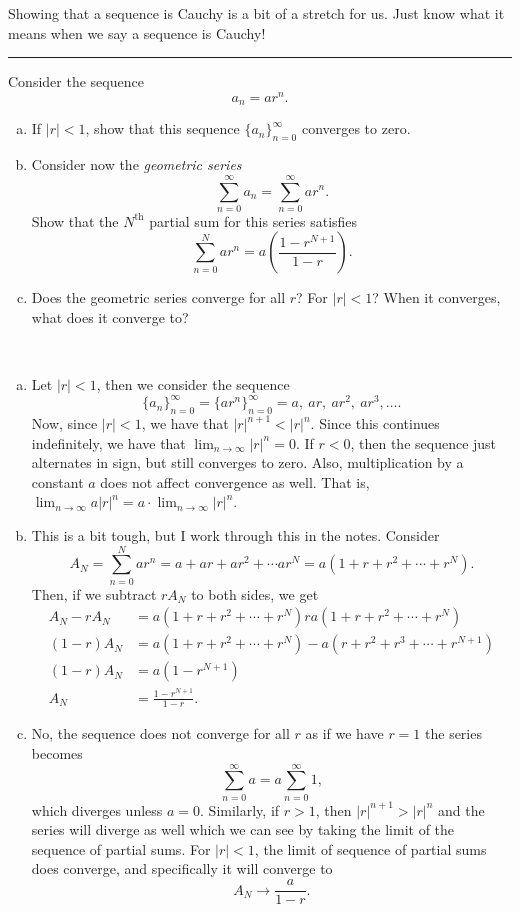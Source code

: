 \documentclass[12pt]{article} %
\begin{document}
\begin{remark}
Showing that a sequence is Cauchy is a bit of a stretch for us.  Just know what it means when we say a sequence is Cauchy!
\end{remark}

\hrule
\begin{problem}
Consider the sequence
\[
a_n = a r^n.
\]
\begin{enumerate}[(a)]
    \item If $|r|<1$, show that this sequence $\{a_n\}_{n=0}^\infty$ converges to zero.
    \item Consider now the \emph{geometric series}
    \[
    \sum_{n=0}^\infty a_n = \sum_{n=0}^\infty ar^n.
    \]
    Show that the $N^\textrm{th}$ partial sum for this series satisfies
    \[
    \sum_{n=0}^N ar^n = a\left( \frac{1-r^{N+1}}{1-r}\right).
    \]
    \item Does the geometric series converge for all $r$? For $|r|<1$? When it converges, what does it converge to?
\end{enumerate}
\end{problem}
\begin{solution}~
\begin{enumerate}[(a)]
    \item Let $|r|<1$, then we consider the sequence
    \[
    \{a_n\}_{n=0}^\infty = \{ar^n\}_{n=0}^\infty = a,~ar,~ar^2,~ar^3,\dots.
    \]
    Now, since $|r|<1$, we have that $|r|^{n+1}<|r|^n$.  Since this continues indefinitely, we have that $\lim_{n\to \infty} |r|^n = 0$.  If $r<0$, then the sequence just alternates in sign, but still converges to zero.  Also, multiplication by a constant $a$ does not affect convergence as well. That is, $\lim_{n\to \infty} a|r|^n = a\cdot \lim_{n\to \infty} |r|^n$.  
    \item This is a bit tough, but I work through this in the notes.  Consider
    \[
    A_N = \sum_{n=0}^N ar^n = a + ar+ar^2 + \cdots ar^N = a(1+r+r^2+\cdots+r^N).
    \]
    Then, if we subtract $rA_N$ to both sides, we get
    \begin{align*}
        A_N - rA_N &= a(1+r+r^2+\cdots + r^N)  ra(1+r+r^2+\cdots+r^N)\\
        (1-r)A_N&= a(1+r+r^2+\cdots+r^N)-a(r+r^2+r^3+\cdots + r^{N+1})\\
        (1-r)A_N&= a(1-r^{N+1})\\
        A_N &= \frac{1-r^{N+1}}{1-r}.
    \end{align*}
    \item No, the sequence does not converge for all $r$ as if we have $r=1$ the series becomes
    \[
    \sum_{n=0}^\infty a = a \sum_{n=0}^\infty 1,
    \]
    which diverges unless $a=0$.  Similarly, if $r>1$, then $|r|^{n+1}>|r|^n$ and the series will diverge as well which we can see by taking the limit of the sequence of partial sums.  For $|r|<1$, the limit of sequence of partial sums does converge, and specifically it will converge to
    \[
    A_N \to \frac{a}{1-r}.
    \]
\end{enumerate}
\end{solution}
\end{document}
